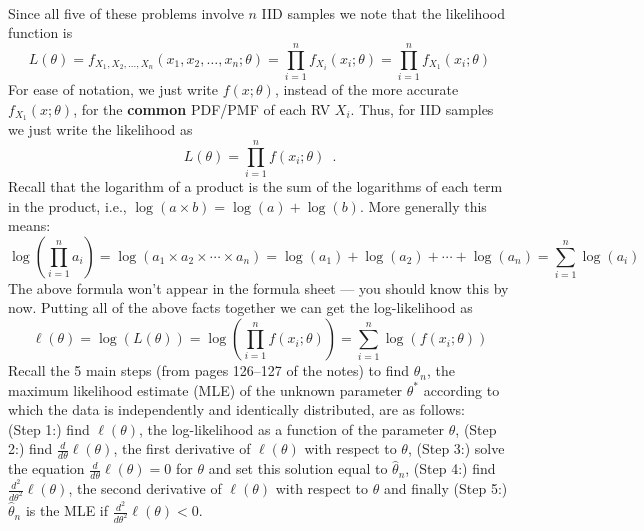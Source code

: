 \begin{Answer}
~\\
Since all five of these problems involve $n$ IID samples we note that the likelihood function is
\[
L(\theta) = f_{X_1,X_2,\ldots,X_n}(x_1,x_2,\ldots,x_n; \theta)
= \prod_{i=1}^n f_{X_i}(x_i;\theta) = \prod_{i=1}^n f_{X_1}(x_i;\theta)
\]
For ease of notation, we just write $f(x;\theta)$, instead of the more accurate $f_{X_1}(x;\theta)$, for the {\bf common} PDF/PMF of each RV $X_i$.  Thus, for IID samples we just write the likelihood as
\[
L(\theta) = \prod_{i=1}^n f(x_i;\theta) \enspace.
\] 
Recall that the logarithm of a product is the sum of the logarithms of each term in the product, i.e., $\log(a \times b) = \log(a)+\log(b)$.  
More generally this means: 
$$\log\left(\prod_{i=1}^n a_i\right) = \log\left( a_1 \times a_2 \times \cdots \times a_n\right) = \log(a_1)+\log(a_2)+\cdots+\log(a_n)=\sum_{i=1}^n \log(a_i)$$
The above formula won't appear in the formula sheet --- you should know this by now.
Putting all of the above facts together we can get the log-likelihood as
\[
\ell(\theta) = \log \left( L(\theta) \right) = \log \left( \prod_{i=1}^n f(x_i;\theta) \right) 
= \sum_{i=1}^n \log\left(f(x_i;\theta)\right)
\] 
Recall the 5 main steps (from pages 126--127 of the notes) to find $\widehat{\theta}_n$, the maximum likelihood estimate (MLE) of the unknown parameter $\theta^*$ according to which the data is independently and identically distributed, are as follows:\\ 
({\sf Step 1:}) find $\ell(\theta)$, the log-likelihood as a function of the parameter $\theta$, 
({\sf Step 2:}) find $\frac{d}{d \theta} \ell(\theta)$, the first derivative of $\ell(\theta)$ with respect to $\theta$, 
({\sf Step 3:}) solve the equation $\frac{d}{d \theta} \ell(\theta)=0$ for $\theta$ and set this solution equal to $\widehat{\theta}_n$, 
({\sf Step 4:}) find $\frac{d^2}{d \theta^2} \ell(\theta)$, the second derivative of $\ell(\theta)$ with respect to $\theta$ and finally 
({\sf Step 5:}) $\widehat{\theta}_n$ is the MLE if $\frac{d^2}{d \theta^2} \ell(\theta) < 0$.


\end{Answer}
